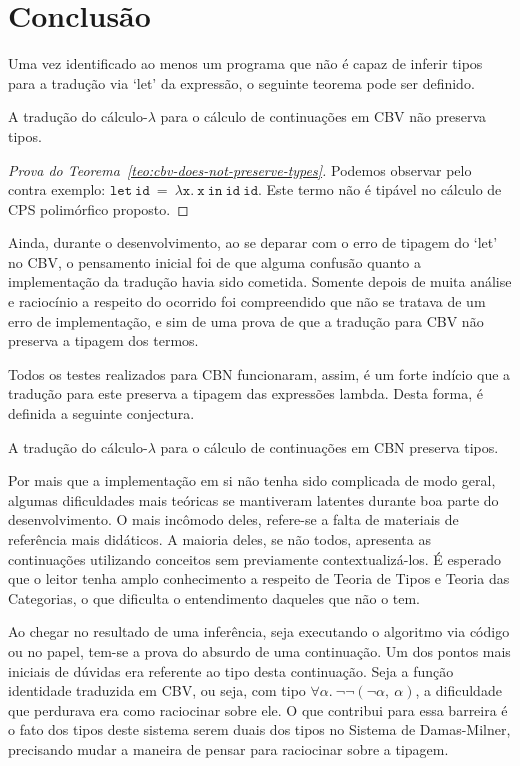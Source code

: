 \chapter{Conclusão}\label{ch:conclusao}
Uma vez identificado ao menos um programa que não é capaz de inferir tipos para a tradução via `let' da expressão, o seguinte teorema pode ser definido.
\begin{teorema}\label{teo:cbv-does-not-preserve-types}
  A tradução do cálculo-$\lambda$ para o cálculo de continuações em CBV não preserva tipos.
\end{teorema}

\begin{proof}[Prova do Teorema~\ref{teo:cbv-does-not-preserve-types}]
  Podemos observar pelo contra exemplo: $\mathtt{let\ id\ =\ \lambda x.\ x\ in\ id\ id}$.
  Este termo não é tipável no cálculo de CPS polimórfico proposto.
  \qedhere
\end{proof}
\noindent Ainda, durante o desenvolvimento, ao se deparar com o erro de tipagem do `let' no CBV, o pensamento inicial foi de que alguma confusão quanto a implementação da tradução havia sido cometida.
Somente depois de muita análise e raciocínio a respeito do ocorrido foi compreendido que não se tratava de um erro de implementação, e sim de uma prova de que a tradução para CBV não preserva a tipagem dos termos.

Todos os testes realizados para CBN funcionaram, assim, é um forte indício que a tradução para este preserva a tipagem das expressões lambda.
Desta forma, é definida a seguinte conjectura.
\begin{conjectura}\label{conj:cbn-preserve-types}
  A tradução do cálculo-$\lambda$ para o cálculo de continuações em CBN preserva tipos.
\end{conjectura}

Por mais que a implementação em si não tenha sido complicada de modo geral, algumas dificuldades mais teóricas se mantiveram latentes durante boa parte do desenvolvimento.
O mais incômodo deles, refere-se a falta de materiais de referência mais didáticos.
A maioria deles, se não todos, apresenta as continuações utilizando conceitos sem previamente contextualizá-los.
É esperado que o leitor tenha amplo conhecimento a respeito de Teoria de Tipos e Teoria das Categorias, o que dificulta o entendimento daqueles que não o tem.

Ao chegar no resultado de uma inferência, seja executando o algoritmo via código ou no papel, tem-se a prova do absurdo de uma continuação.
Um dos pontos mais iniciais de dúvidas era referente ao tipo desta continuação.
Seja a função identidade traduzida em CBV, ou seja, com tipo $\forall\alpha.\ \neg\neg(\neg\alpha,\ \alpha)$, a dificuldade que perdurava era como raciocinar sobre ele.
O que contribui para essa barreira é o fato dos tipos deste sistema serem duais dos tipos no Sistema de Damas-Milner, precisando mudar a maneira de pensar para raciocinar sobre a tipagem.

